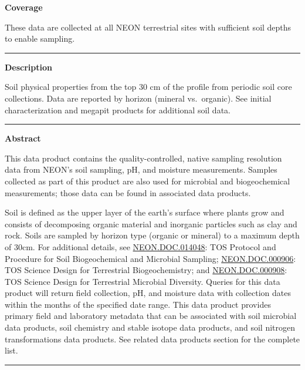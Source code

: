 \documentclass[]{article}
\begin{document}
\textbf{Coverage}

These data are collected at all NEON terrestrial sites with sufficient
soil depths to enable sampling.

\begin{center}\rule{0.5\linewidth}{\linethickness}\end{center}

\textbf{Description}

Soil physical properties from the top 30 cm of the profile from periodic
soil core collections. Data are reported by horizon (mineral
vs.~organic). See initial characterization and megapit products for
additional soil data.

\begin{center}\rule{0.5\linewidth}{\linethickness}\end{center}

\textbf{Abstract}

This data product contains the quality-controlled, native sampling
resolution data from NEON's soil sampling, pH, and moisture
measurements. Samples collected as part of this product are also used
for microbial and biogeochemical measurements; those data can be found
in associated data products.

Soil is defined as the upper layer of the earth's surface where plants
grow and consists of decomposing organic material and inorganic
particles such as clay and rock. Soils are sampled by horizon type
(organic or mineral) to a maximum depth of 30cm. For additional details,
see
\href{http://data.neonscience.org/api/v0/documents/NEON.DOC.014048vG}{NEON.DOC.014048}:
TOS Protocol and Procedure for Soil Biogeochemical and Microbial
Sampling;
\href{http://data.neonscience.org/api/v0/documents/NEON.DOC.000906vA}{NEON.DOC.000906}:
TOS Science Design for Terrestrial Biogeochemistry; and
\href{http://data.neonscience.org/api/v0/documents/NEON.DOC.000908vB}{NEON.DOC.000908}:
TOS Science Design for Terrestrial Microbial Diversity. Queries for this
data product will return field collection, pH, and moisture data with
collection dates within the months of the specified date range. This
data product provides primary field and laboratory metadata that can be
associated with soil microbial data products, soil chemistry and stable
isotope data products, and soil nitrogen transformations data products.
See related data products section for the complete list.

\begin{center}\rule{0.5\linewidth}{\linethickness}\end{center}
\end{document}
